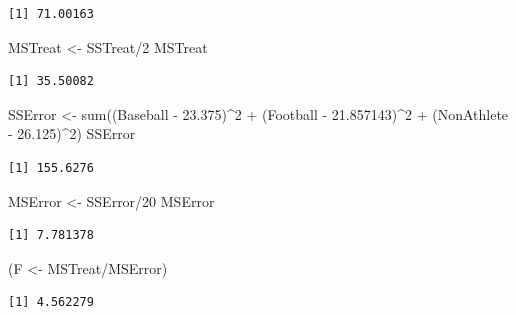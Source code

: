 \documentclass[
]{article}
\newenvironment{Shaded}{\begin{snugshade}}{\end{snugshade}}
\newcommand{\DecValTok}[1]{\textcolor[rgb]{0.00,0.00,0.81}{#1}}
\newcommand{\FloatTok}[1]{\textcolor[rgb]{0.00,0.00,0.81}{#1}}
\newcommand{\FunctionTok}[1]{\textcolor[rgb]{0.00,0.00,0.00}{#1}}
\newcommand{\NormalTok}[1]{#1}
\newcommand{\OtherTok}[1]{\textcolor[rgb]{0.56,0.35,0.01}{#1}}
\newcommand{\SpecialCharTok}[1]{\textcolor[rgb]{0.00,0.00,0.00}{#1}}
\begin{document}
\begin{verbatim}
[1] 71.00163
\end{verbatim}

\begin{Shaded}
\begin{Highlighting}[]
\NormalTok{MSTreat }\OtherTok{\textless{}{-}}\NormalTok{ SSTreat}\SpecialCharTok{/}\DecValTok{2}
\NormalTok{MSTreat}
\end{Highlighting}
\end{Shaded}

\begin{verbatim}
[1] 35.50082
\end{verbatim}

\begin{Shaded}
\begin{Highlighting}[]
\NormalTok{SSError }\OtherTok{\textless{}{-}} \FunctionTok{sum}\NormalTok{((Baseball }\SpecialCharTok{{-}} \FloatTok{23.375}\NormalTok{)}\SpecialCharTok{\^{}}\DecValTok{2} \SpecialCharTok{+}\NormalTok{ (Football }\SpecialCharTok{{-}} \FloatTok{21.857143}\NormalTok{)}\SpecialCharTok{\^{}}\DecValTok{2} \SpecialCharTok{+}\NormalTok{ (NonAthlete }\SpecialCharTok{{-}} \FloatTok{26.125}\NormalTok{)}\SpecialCharTok{\^{}}\DecValTok{2}\NormalTok{)}
\NormalTok{SSError}
\end{Highlighting}
\end{Shaded}

\begin{verbatim}
[1] 155.6276
\end{verbatim}

\begin{Shaded}
\begin{Highlighting}[]
\NormalTok{MSError }\OtherTok{\textless{}{-}}\NormalTok{ SSError}\SpecialCharTok{/}\DecValTok{20}
\NormalTok{MSError}
\end{Highlighting}
\end{Shaded}

\begin{verbatim}
[1] 7.781378
\end{verbatim}

\begin{Shaded}
\begin{Highlighting}[]
\NormalTok{(F }\OtherTok{\textless{}{-}}\NormalTok{ MSTreat}\SpecialCharTok{/}\NormalTok{MSError)}
\end{Highlighting}
\end{Shaded}

\begin{verbatim}
[1] 4.562279
\end{verbatim}
\end{document}
